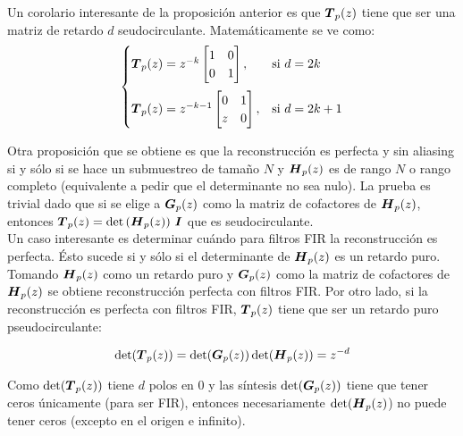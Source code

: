 		Un corolario interesante de la proposición anterior es que $\boldsymbol{T}_p(z)$ tiene que ser una matriz de retardo $d$ seudocirculante. Matemáticamente se ve como:
		\begin{equation*}
		\begin{cases}\boldsymbol{T}_p(z)=z^{-k}\begin{bmatrix}1&0\\0&1\end{bmatrix}, &\text{si }d=2k \\[0.5cm]
		\boldsymbol{T}_p(z)=z^{-k-1}\begin{bmatrix}0&1\\z&0\end{bmatrix}, &\text{si }d=2k+1\end{cases}
		\end{equation*}

		Otra proposición que se obtiene es que la reconstrucción es perfecta y sin aliasing si y sólo si se hace un submuestreo de tamaño $N$ y $\boldsymbol{H}_p(z)$ es de rango $N$ o rango completo (equivalente a pedir que el determinante no sea nulo). La prueba es trivial dado que si se elige a $\boldsymbol{G}_p(z)$ como la matriz de cofactores de $\boldsymbol{H}_p(z)$, entonces $\boldsymbol{T}_p(z) = \det\left(\boldsymbol{H}_p(z)\right)\,\boldsymbol{I}$ que es seudocirculante.\\

		Un caso interesante es determinar cuándo para filtros FIR la reconstrucción es perfecta. Ésto sucede si y sólo si el determinante de $\boldsymbol{H}_p(z)$ es un retardo puro.\\
		\indent Tomando $\boldsymbol{H}_p(z)$ como un retardo puro y $\boldsymbol{G}_p(z)$ como la matriz de cofactores de $\boldsymbol{H}_p(z)$ se obtiene reconstrucción perfecta con filtros FIR. Por otro lado, si la reconstrucción es perfecta con filtros FIR, $\boldsymbol{T}_p(z)$ tiene que ser un retardo puro pseudocirculante: 
		
		\begin{equation*}
			\det(\boldsymbol{T}_p(z)) = \det(\boldsymbol{G}_p(z)) \det(\boldsymbol{H}_p(z)) = z^{-d}
		\end{equation*}
		
		Como $\det(\boldsymbol{T}_p(z))$ tiene $d$ polos en 0 y las síntesis $\det(\boldsymbol{G}_p(z))$ tiene que tener ceros únicamente (para ser FIR), entonces necesariamente $\det(\boldsymbol{H}_p(z)$) no puede tener ceros (excepto en el origen e infinito).\\


